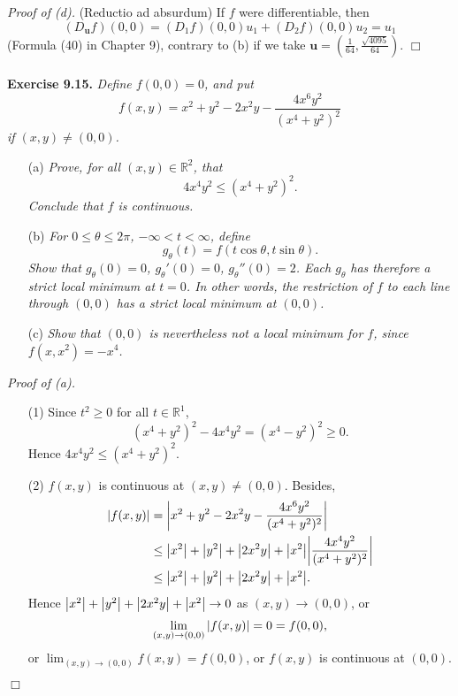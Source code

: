 \documentclass{article}
\begin{document}
\emph{Proof of (d).}
  (Reductio ad absurdum)
  If $f$ were differentiable,
  then
  \[
    (D_{\mathbf{u}}f)(0,0) = (D_1 f)(0,0)u_1 + (D_2 f)(0,0)u_2 = u_1
  \]
  (Formula (40) in Chapter 9), contrary to (b)
  if we take $\mathbf{u} = \left(\frac{1}{64}, \frac{\sqrt{4095}}{64} \right)$.
$\Box$ \\\\






\textbf{Exercise 9.15.}
\emph{Define $f(0,0) = 0$, and put
\[
  f(x,y) = x^2+y^2-2x^2y-\frac{4x^6y^2}{(x^4+y^2)^2}
\]
if $(x,y) \neq (0,0)$.}
\begin{enumerate}
\item[(a)]
  \emph{Prove, for all $(x,y) \in \mathbb{R}^2$, that
  \[
    4x^4y^2 \leq (x^4+y^2)^2.
  \]
  Conclude that $f$ is continuous.}

\item[(b)]
  \emph{For $0 \leq \theta \leq 2\pi$, $-\infty < t < \infty$, define
  \[
    g_{\theta}(t) = f(t\cos\theta, t\sin\theta).
  \]
  Show that $g_{\theta}(0) = 0$, $g_{\theta}'(0) = 0$, $g_{\theta}''(0) = 2$.
  Each $g_{\theta}$ has therefore a strict local minimum at $t=0$.
  In other words, the restriction of $f$ to each line through $(0,0)$
  has a strict local minimum at $(0,0)$.}

\item[(c)]
  \emph{Show that $(0,0)$ is nevertheless not a local minimum for $f$,
  since $f(x,x^2)=-x^4$.} \\
\end{enumerate}



\emph{Proof of (a).}
\begin{enumerate}
\item[(1)]
  Since $t^2 \geq 0$ for all $t \in \mathbb{R}^1$,
  \[
    (x^4+y^2)^2 - 4x^4y^2 = (x^4-y^2)^2 \geq 0.
  \]
  Hence $4x^4y^2 \leq (x^4+y^2)^2$.
\item[(2)]
  $f(x,y)$ is continuous at $(x,y) \neq (0,0)$.
  Besides,
  \begin{align*}
    \abs{f(x,y)}
    &= \abs{x^2+y^2-2x^2y-\frac{4x^6y^2}{(x^4+y^2)^2}} \\
    &\leq \abs{x^2}+\abs{y^2}+\abs{2x^2y}+\abs{x^2}\abs{\frac{4x^4y^2}{(x^4+y^2)^2}} \\
    &\leq \abs{x^2}+\abs{y^2}+\abs{2x^2y}+\abs{x^2}.
  \end{align*}
  Hence
  $\abs{x^2}+\abs{y^2}+\abs{2x^2y}+\abs{x^2} \to 0$ as $(x,y) \to (0,0)$,
  or
  \[
    \lim_{(x,y) \to (0,0)} \abs{f(x,y)} = 0 = f(0,0),
  \]
  or $\lim_{(x,y) \to (0,0)} f(x,y) = f(0,0)$,
  or $f(x,y)$ is continuous at $(0,0)$.
\end{enumerate}
$\Box$ \\
\end{document}
